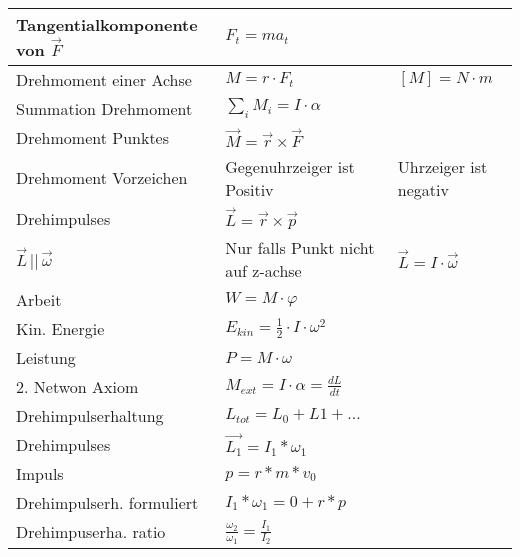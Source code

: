\begin{tabularx}{\columnwidth}{@{}XXX@{}}
	Tangentialkomponente von $\vec{F}$ & $F_t = ma_t$                                                                     \\ \hline
	Drehmoment einer Achse             & $M = r\cdot F_t$                              & $[M] = N\cdot m$                 \\ \hline
	Summation Drehmoment               & $\sum_{i} M_i = I\cdot\alpha$                                                    \\ \hline
	Drehmoment Punktes                 & $\vec{M} = \vec{r} \times \vec{F}$                                               \\ \hline
	Drehmoment Vorzeichen              & Gegenuhrzeiger ist Positiv                    & Uhrzeiger ist negativ            \\ \hline
	Drehimpulses                       & $\vec{L} = \vec{r} \times \vec{p}$                                               \\ \hline
	$\vec{L}\,||\,\vec{\omega}$        & Nur falls Punkt nicht auf z-achse             & $\vec{L} = I \cdot \vec{\omega}$ \\ \hline
	Arbeit                             & $W = M \cdot \varphi$                                                            \\ \hline
	Kin. Energie                       & $E_{kin} = \frac{1}{2}\cdot I \cdot \omega^2$                                    \\ \hline
	Leistung                           & $P = M \cdot \omega$                                                             \\ \hline
	2. Netwon Axiom                    & $M_{ext} = I \cdot \alpha = \frac{dL}{dt}$                                      \\ \hline
	Drehimpulserhaltung				   & $L_{tot} = L_0 + L1 + ...$ \\ \hline
	Drehimpulses                       & $\vec{L_1} = I_1*\omega_1$                                               \\ \hline
	Impuls							   & $p = r*m*v_0$ \\ \hline
	Drehimpulserh. formuliert		   & $I_1*\omega_1 = 0 + r*p$ \\ \hline
	Drehimpuserha. ratio 			   & $\frac{\omega_2}{\omega_1} = \frac{I_1}{I_2}$ \\ \hline

\end{tabularx}